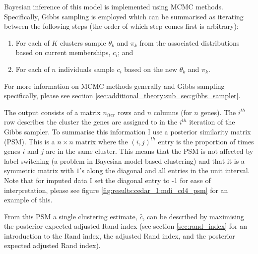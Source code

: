 \documentclass[12pt]{article} %
\begin{document}
	Bayesian inference of this model is implemented using MCMC methods. Specifically, Gibbs sampling is employed which can be summarised as iterating between the following steps (the order of which step comes first is arbitrary):
	\begin{enumerate}
		\item For each of $K$ clusters sample $\theta_k$ and $\pi_k$ from the associated distributions based on current memberships, $c_i$; and
		\item For each of $n$ individuals sample $c_i$ based on the new $\theta_k$ and $\pi_k$.
	\end{enumerate}
	For more information on MCMC methods generally and Gibbs sampling specifically, please see section \ref{sec:additional_theory:sub_sec:gibbs_sampler}.
	
	
	The output consists of a matrix $n_{iter}$ rows and $n$ columns (for $n$ genes). The $i^{th}$ row describes the cluster the genes are assigned to in the $i^{th}$ iteration of the Gibbs sampler. To summarise this information I use a posterior similarity matrix (PSM). This is a $n \times n$ matrix where the $(i,j)^{th}$ entry is the proportion of times genes $i$ and $j$ are in the same cluster. This means that the PSM is not affected by label switching (a problem in Bayesian model-based clustering) and that it is a symmetric matrix with $1$'s along the diagonal and all entries in the unit interval. Note that for imputed data I set the diagonal entry to -1 for ease of interpretation, please see figure \ref{fig:results:cedar_1:mdi_cd4_psm} for an example of this.
	
	From this PSM a single clustering estimate, $\hat{c}$, can be described by maximising the posterior expected adjusted Rand index \citep{FritschImprovedcriteriaclustering2009} (see section \ref{sec:rand_index} for an introduction to the Rand index, the adjusted Rand index, and the posterior expected adjusted Rand index).
	
	
\end{document}
